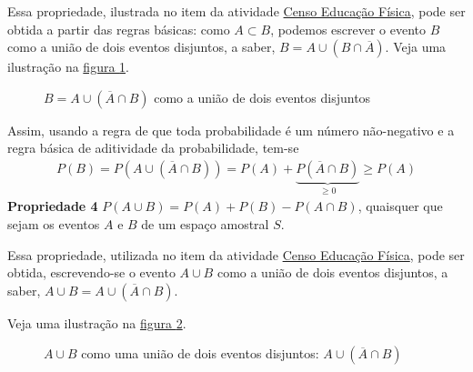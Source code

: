Essa propriedade, ilustrada no item  da atividade \hyperref[censo-educacao-fisica]{Censo Educação Física}, pode ser obtida a partir das regras básicas:
como \(A\subset B\), podemos escrever o evento \(B\) como a união de dois eventos disjuntos, a saber,  \(B=A\cup (B\cap \overline{A})\). Veja uma ilustração na \hyperref[eventosdijuntos]{figura \ref{eventosdijuntos}}.
\begin{figure}[H]
\centering

\caption{\(B=A\cup (\overline{A}\cap B)\) como a união de dois eventos disjuntos}
\label{eventosdijuntos}
\end{figure}


Assim, usando a regra de que toda probabilidade é um número não-negativo e a regra básica de aditividade da probabilidade, tem-se
\begin{equation*}
\begin{split}P(B)=P(A\cup(\overline{A}\cap B))=P(A)+\underbrace{P(\overline{A}\cap B)}_{\geq 0}\geq P(A)\end{split}
\end{equation*}
\textbf{Propriedade 4} \(P(A\cup B)=P(A)+P(B)-P(A\cap B)\), quaisquer que sejam os eventos \(A\) e \(B\) de um espaço amostral \(S\).

Essa propriedade, utilizada no item  da atividade \hyperref[censo-educacao-fisica]{Censo Educação Física}, pode ser obtida, escrevendo-se o evento \(A\cup B\) como a união de dois eventos disjuntos, a saber, \(A\cup B=A\cup (\overline{A}\cap B)\).

Veja uma ilustração na \hyperref[eventosdijuntos2]{figura \ref{eventosdijuntos2}}.
\begin{figure}[H]
\centering


\caption{\(A\cup B\) como uma união de dois eventos disjuntos: \(A\cup (\overline{A}\cap B)\)}
\label{eventosdijuntos2}
\end{figure}

